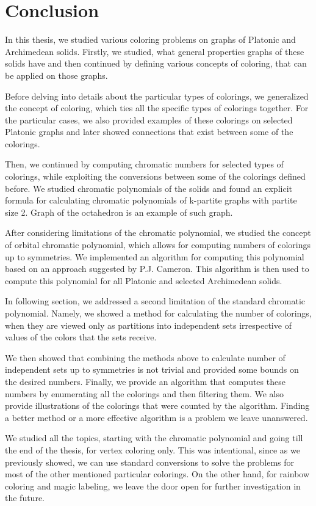 \chapter*{Conclusion}

\begin{highlight}

In this thesis, we studied various coloring problems on graphs of Platonic and Archimedean solids. Firstly, we studied, what general properties graphs of these solids have and then continued by defining various concepts of coloring, that can be applied on those graphs.

Before delving into details about the particular types of colorings, we generalized the concept of coloring, which ties all the specific types of colorings together. For the particular cases, we also provided examples of these colorings on selected Platonic graphs and later showed connections that exist between some of the colorings.

Then, we continued by computing chromatic numbers for selected types of colorings, while exploiting the conversions between some of the colorings defined before. We studied chromatic polynomials of the solids and found an explicit formula for calculating chromatic polynomials of k-partite graphs with partite size 2. Graph of the octahedron is an example of such graph.

After considering limitations of the chromatic polynomial, we studied the concept of orbital chromatic polynomial, which allows for computing numbers of colorings up to symmetries. We implemented an algorithm for computing this polynomial based on an approach suggested by P.J. Cameron. This algorithm is then used to compute this polynomial for all Platonic and selected Archimedean solids.

In following section, we addressed a second limitation of the standard chromatic polynomial. Namely, we showed a method for calculating the number of colorings, when they are viewed only as partitions into independent sets irrespective of values of the colors that the sets receive.

We then showed that combining the methods above to calculate number of independent sets up to symmetries is not trivial and provided some bounds on the desired numbers. Finally, we provide an algorithm that computes these numbers by enumerating all the colorings and then filtering them. We also provide illustrations of the colorings that were counted by the algorithm. Finding a better method or a more effective algorithm is a problem we leave unanswered.

We studied all the topics, starting with the chromatic polynomial and going till the end of the thesis, for vertex coloring only. This was intentional, since as we previously showed, we can use standard conversions to solve the problems for most of the other mentioned particular colorings. On the other hand, for rainbow coloring and magic labeling, we leave the door open for further investigation in the future.

\end{highlight}